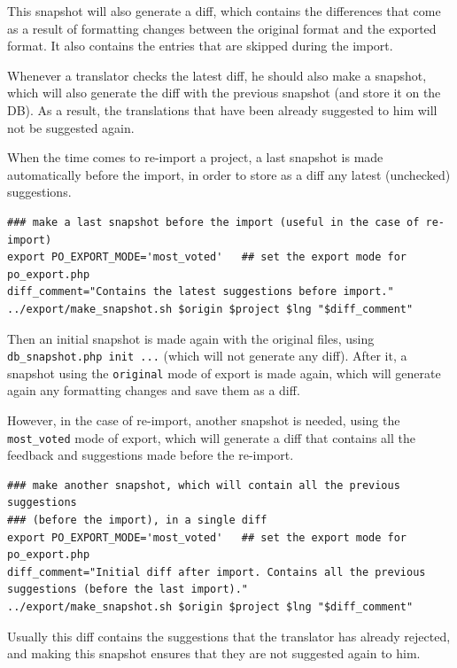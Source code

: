 \documentclass[11pt]{article}
\begin{document}
\begin{itemize}
     This snapshot will also generate a diff, which contains the
     differences that come as a result of formatting changes between the
     original format and the exported format. It also contains the
     entries that are skipped during the import.
     
     Whenever a translator checks the latest diff, he should also make a
     snapshot, which will also generate the diff with the previous
     snapshot (and store it on the DB). As a result, the translations
     that have been already suggested to him will not be suggested
     again.

     When the time comes to re-import a project, a last snapshot is made
     automatically before the import, in order to store as a diff any
     latest (unchecked) suggestions.

\begin{verbatim}
### make a last snapshot before the import (useful in the case of re-import)
export PO_EXPORT_MODE='most_voted'   ## set the export mode for po_export.php
diff_comment="Contains the latest suggestions before import."
../export/make_snapshot.sh $origin $project $lng "$diff_comment"
\end{verbatim}


   
     Then an initial snapshot is made again with the original files,
     using \texttt{db\_snapshot.php init ...} (which will not generate any
     diff).  After it, a snapshot using the \texttt{original} mode of export is
     made again, which will generate again any formatting changes and
     save them as a diff.

     However, in the case of re-import, another snapshot is needed,
     using the \texttt{most\_voted} mode of export, which will generate a diff
     that contains all the feedback and suggestions made before the
     re-import.

\begin{verbatim}
### make another snapshot, which will contain all the previous suggestions
### (before the import), in a single diff
export PO_EXPORT_MODE='most_voted'   ## set the export mode for po_export.php
diff_comment="Initial diff after import. Contains all the previous suggestions (before the last import)."
../export/make_snapshot.sh $origin $project $lng "$diff_comment"
\end{verbatim}


     Usually this diff contains the suggestions that the translator has
     already rejected, and making this snapshot ensures that they are
     not suggested again to him.


\end{itemize}
\end{document}
